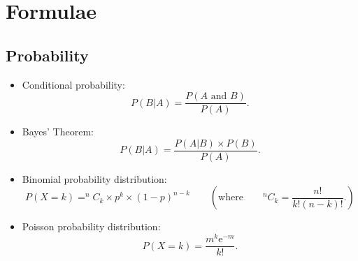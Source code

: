







\newpage
\section*{Formulae}
\subsection*{Probability}
\begin{itemize}

\item Conditional probability:
\begin{equation*}
P(B|A)=\frac{P\left( A\text{ and }B\right) }{P\left( A\right) }.
\end{equation*}


\item Bayes' Theorem:
\begin{equation*}
P(B|A)=\frac{P\left(A|B\right) \times P(B) }{P\left( A\right) }.
\end{equation*}


\item Binomial probability distribution:
\begin{equation*}
P(X = k) = ^{n}C_{k} \times p^{k} \times \left( 1-p\right) ^{n-k}\qquad \left( \text{where}\qquad
^{n}C_{k} =\frac{n!}{k!\left(n-k\right) !}. \right)
\end{equation*}

\item Poisson probability distribution:
\begin{equation*}
P(X = k) =\frac{m^{k}\mathrm{e}^{-m}}{k!}.
\end{equation*}
\end{itemize}

